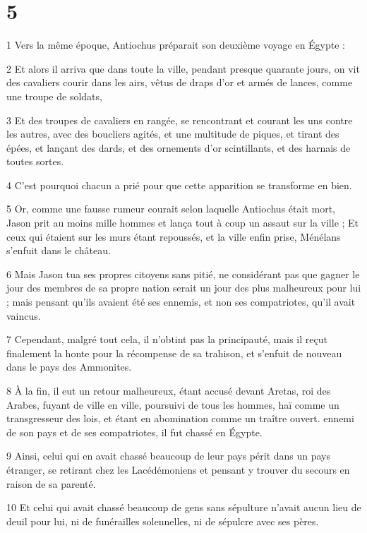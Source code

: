 \chapter{5}

\par 1 Vers la même époque, Antiochus préparait son deuxième voyage en Égypte :
\par 2 Et alors il arriva que dans toute la ville, pendant presque quarante jours, on vit des cavaliers courir dans les airs, vêtus de draps d'or et armés de lances, comme une troupe de soldats,
\par 3 Et des troupes de cavaliers en rangée, se rencontrant et courant les uns contre les autres, avec des boucliers agités, et une multitude de piques, et tirant des épées, et lançant des dards, et des ornements d'or scintillants, et des harnais de toutes sortes.
\par 4 C'est pourquoi chacun a prié pour que cette apparition se transforme en bien.
\par 5 Or, comme une fausse rumeur courait selon laquelle Antiochus était mort, Jason prit au moins mille hommes et lança tout à coup un assaut sur la ville ; Et ceux qui étaient sur les murs étant repoussés, et la ville enfin prise, Ménélans s'enfuit dans le château.
\par 6 Mais Jason tua ses propres citoyens sans pitié, ne considérant pas que gagner le jour des membres de sa propre nation serait un jour des plus malheureux pour lui ; mais pensant qu'ils avaient été ses ennemis, et non ses compatriotes, qu'il avait vaincus.
\par 7 Cependant, malgré tout cela, il n'obtint pas la principauté, mais il reçut finalement la honte pour la récompense de sa trahison, et s'enfuit de nouveau dans le pays des Ammonites.
\par 8 À la fin, il eut un retour malheureux, étant accusé devant Aretas, roi des Arabes, fuyant de ville en ville, poursuivi de tous les hommes, haï comme un transgresseur des lois, et étant en abomination comme un traître ouvert. ennemi de son pays et de ses compatriotes, il fut chassé en Égypte.
\par 9 Ainsi, celui qui en avait chassé beaucoup de leur pays périt dans un pays étranger, se retirant chez les Lacédémoniens et pensant y trouver du secours en raison de sa parenté.
\par 10 Et celui qui avait chassé beaucoup de gens sans sépulture n'avait aucun lieu de deuil pour lui, ni de funérailles solennelles, ni de sépulcre avec ses pères.
